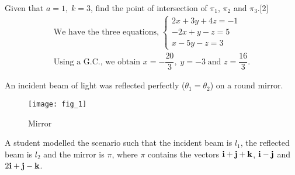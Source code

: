 \documentclass[12pt, a4 paper]{article}
\begin{document}
\begin{outline}[enumerate]
					\color{black}
					\2 Given that $a = 1,\;k = 3$, find the point of intersection of ${\pi _1}$, ${\pi _2}$ and ${\pi _3}$.\hfill[2]
					\color{blue}
					\[\begin{array}{l}{\textrm{We have the three equations,}}\;\left\{ \begin{array}{l}2x + 3y + 4z =  - 1\\ - 2x + y - z = 5\\x - 5y - z = 3\end{array} \right.\\{\textrm{Using a G}}{\textrm{.C}}{\textrm{., we obtain }}x =  - \dfrac{{20}}{3},\;y =  - 3\;{\textrm{and }}z = \dfrac{{16}}{3}.\end{array}\]
					\color{black}
										
					\1 An incident beam of light was reflected perfectly (${\theta _1} = {\theta _2}$) on a round mirror.
															        
					\begin{figure}[h]
						\centering
						\texttt{[image: fig\_1]}
						\caption{Mirror}
					\end{figure}
															        
					A student modelled the scenario such that the incident beam is ${l_1}$, the reflected beam is ${l_2}$ and the mirror is $\pi $, where $\pi $ contains the vectors ${\bf{i}} + {\bf{j}} + {\bf{k}}$, ${\bf{i}} - {\bf{j}}$ and $2{\bf{i}} + {\bf{j}} - {\bf{k}}$.
															        

\end{outline}
\end{document}
